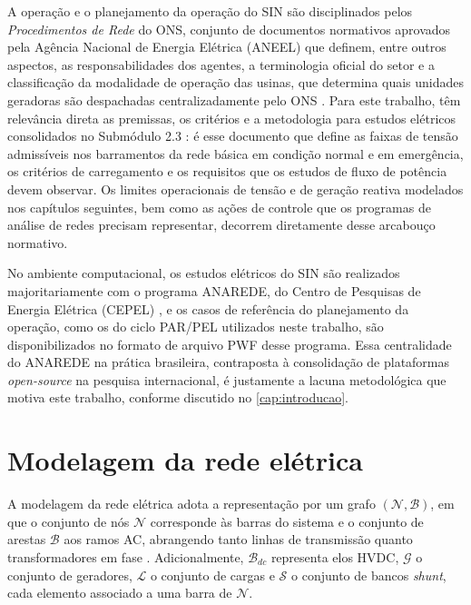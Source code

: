 A operação e o planejamento da operação do SIN são disciplinados pelos \emph{Procedimentos de Rede} do ONS, conjunto de documentos normativos aprovados pela Agência Nacional de Energia Elétrica (ANEEL) que definem, entre outros aspectos, as responsabilidades dos agentes, a terminologia oficial do setor \cite{ons2025sm12} e a classificação da modalidade de operação das usinas, que determina quais unidades geradoras são despachadas centralizadamente pelo ONS \cite{ons2022sm72}. Para este trabalho, têm relevância direta as premissas, os critérios e a metodologia para estudos elétricos consolidados no Submódulo 2.3 \cite{ons2026sm23cr, ons2026sm23mt}: é esse documento que define as faixas de tensão admissíveis nos barramentos da rede básica em condição normal e em emergência, os critérios de carregamento e os requisitos que os estudos de fluxo de potência devem observar. Os limites operacionais de tensão e de geração reativa modelados nos capítulos seguintes, bem como as ações de controle que os programas de análise de redes precisam representar, decorrem diretamente desse arcabouço normativo.

No ambiente computacional, os estudos elétricos do SIN são realizados majoritariamente com o programa ANAREDE, do Centro de Pesquisas de Energia Elétrica (CEPEL) \cite{cepel2023anarede}, e os casos de referência do planejamento da operação, como os do ciclo PAR/PEL utilizados neste trabalho, são disponibilizados no formato de arquivo PWF desse programa. Essa centralidade do ANAREDE na prática brasileira, contraposta à consolidação de plataformas \textit{open-source} na pesquisa internacional, é justamente a lacuna metodológica que motiva este trabalho, conforme discutido no \autoref{cap:introducao}.

\section{Modelagem da rede elétrica}
\label{sec:rede-eletrica}

A modelagem da rede elétrica adota a representação por um grafo $(\mathcal{N}, \mathcal{B})$, em que o conjunto de nós $\mathcal{N}$ corresponde às barras do sistema e o conjunto de arestas $\mathcal{B}$ aos ramos AC, abrangendo tanto linhas de transmissão quanto transformadores em fase \cite{monticelli1983fluxo, molzahn2019survey}. Adicionalmente, $\mathcal{B}_{dc}$ representa elos HVDC, $\mathcal{G}$ o conjunto de geradores, $\mathcal{L}$ o conjunto de cargas e $\mathcal{S}$ o conjunto de bancos \textit{shunt}, cada elemento associado a uma barra de $\mathcal{N}$.

